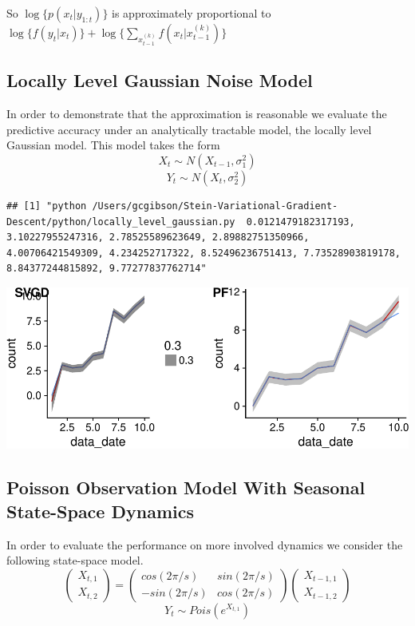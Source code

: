 \documentclass[]{article}
\begin{document}
So \(\log\{p(x_{t} | y_{1:t})\}\) is approximately proportional to
\(\log\{f(y_t | x_t)\} + \log\{\sum_{x_{t-1}^{(k)}} f(x_t | x_{t - 1}^{(k)})\}\)

\subsection{Locally Level Gaussian Noise
Model}\label{locally-level-gaussian-noise-model}

In order to demonstrate that the approximation is reasonable we evaluate
the predictive accuracy under an analytically tractable model, the
locally level Gaussian model. This model takes the form
\[X_t \sim N(X_{t-1},\sigma_1^2)\] \[Y_t \sim N(X_t, \sigma_2^2)\]

\begin{verbatim}
## [1] "python /Users/gcgibson/Stein-Variational-Gradient-Descent/python/locally_level_gaussian.py  0.0121479182317193, 3.10227955247316, 2.78525589623649, 2.89882751350966, 4.00706421549309, 4.234252717322, 8.52496236751413, 7.73528903819178, 8.84377244815892, 9.77277837762714"
\end{verbatim}

\includegraphics{ssvgd_files/figure-latex/unnamed-chunk-2-1.pdf}

\subsection{Poisson Observation Model With Seasonal State-Space
Dynamics}\label{poisson-observation-model-with-seasonal-state-space-dynamics}

In order to evaluate the performance on more involved dynamics we
consider the following state-space model.
\[\begin{pmatrix} X_{t,1} \\ X_{t,2} \end{pmatrix} = \begin{pmatrix} cos(2\pi/s) & sin(2\pi/s) \\ -sin(2\pi/s) & cos(2\pi/s) \end{pmatrix} \begin{pmatrix} X_{t-1,1} \\ X_{t-1,2} \end{pmatrix} \]
\[Y_t \sim Pois(e^{X_{t,1}})\]
\end{document}

